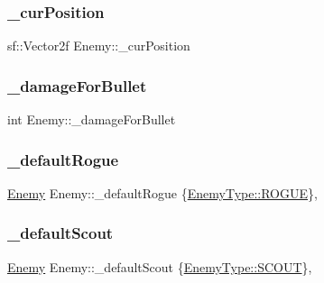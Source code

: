 \subsubsection{\texorpdfstring{\+\_\+cur\+Position}{\_curPosition}}
{\footnotesize\ttfamily sf\+::\+Vector2f Enemy\+::\+\_\+cur\+Position\hspace{0.3cm}{\ttfamily [private]}}

\mbox{\label{class_enemy_af922f36da4c166ab18091c297f7faa0e}} 
\subsubsection{\texorpdfstring{\+\_\+damage\+For\+Bullet}{\_damageForBullet}}
{\footnotesize\ttfamily int Enemy\+::\+\_\+damage\+For\+Bullet\hspace{0.3cm}{\ttfamily [private]}}

\mbox{\label{class_enemy_a678760b166085ad28d2568c80dde9c70}} 
\subsubsection{\texorpdfstring{\+\_\+default\+Rogue}{\_defaultRogue}}
{\footnotesize\ttfamily \hyperlink{class_enemy}{Enemy} Enemy\+::\+\_\+default\+Rogue \{\hyperlink{_enemy_8h_ac3e413a86119db4b031458c7259e268ea416f104f4dfca42fccfd1d6e7534d3ad}{Enemy\+Type\+::\+R\+O\+G\+UE}\}\hspace{0.3cm}{\ttfamily [static]}, {\ttfamily [private]}}

\mbox{\label{class_enemy_a2fc8a9f17adf285b5e4de6313634be22}} 
\subsubsection{\texorpdfstring{\+\_\+default\+Scout}{\_defaultScout}}
{\footnotesize\ttfamily \hyperlink{class_enemy}{Enemy} Enemy\+::\+\_\+default\+Scout \{\hyperlink{_enemy_8h_ac3e413a86119db4b031458c7259e268eaa171194925053f44024a82de9d20148a}{Enemy\+Type\+::\+S\+C\+O\+UT}\}\hspace{0.3cm}{\ttfamily [static]}, {\ttfamily [private]}}

